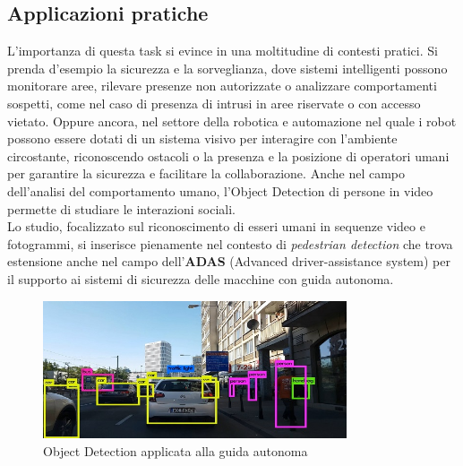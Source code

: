 \documentclass[12pt]{article}
\begin{document}
\subsection{Applicazioni pratiche}
L'importanza di questa task si evince in una moltitudine di contesti pratici. Si prenda d'esempio la sicurezza e la sorveglianza, dove sistemi intelligenti possono monitorare aree, rilevare presenze non autorizzate o analizzare comportamenti sospetti, come nel caso di presenza di intrusi in aree riservate o con accesso vietato. Oppure ancora, nel settore della robotica e automazione nel quale i robot possono essere dotati di un sistema visivo per interagire con l'ambiente circostante, riconoscendo ostacoli o la presenza e la posizione di operatori umani per garantire la sicurezza e facilitare la collaborazione. Anche nel campo dell'analisi del comportamento umano, l'Object Detection di persone in video permette di studiare le interazioni sociali. \\
Lo studio, focalizzato sul riconoscimento di esseri umani in sequenze video e fotogrammi, si inserisce pienamente nel contesto di \textit{pedestrian detection} che trova estensione anche nel campo dell'\textbf{ADAS} (Advanced driver-assistance system) per il supporto ai sistemi di sicurezza delle macchine con guida autonoma.

\begin{figure}[H]
    \centering
    \includegraphics[width=0.80\textwidth]{./img/object-detection-example0.jpg}
    \caption{Object Detection applicata alla guida autonoma}
    \label{fig:adas-example}
\end{figure}
\end{document}
